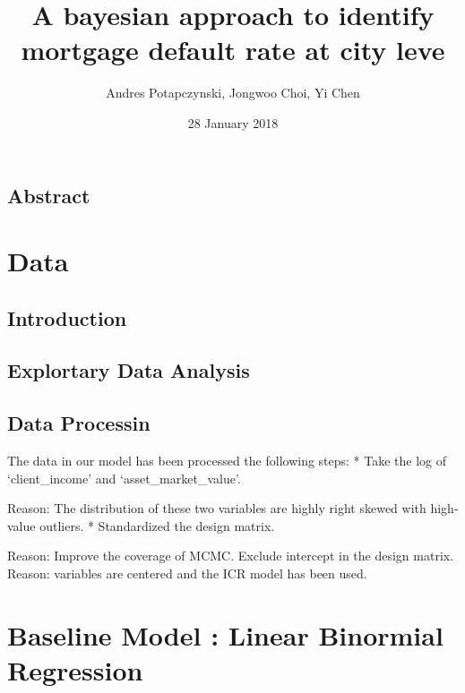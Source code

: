 \documentclass[]{tufte-handout}
\title{A bayesian approach to identify mortgage default rate at city leve}
\author{Andres Potapczynski, Jongwoo Choi, Yi Chen}
\date{28 January 2018}
\begin{document}
\maketitle



{
\setcounter{tocdepth}{2}
\tableofcontents
}

\hypertarget{abstract}{%
\subsection*{Abstract}\label{abstract}}

\hypertarget{data}{%
\section{Data}\label{data}}

\hypertarget{introduction}{%
\subsection{Introduction}\label{introduction}}

\hypertarget{explortary-data-analysis}{%
\subsection{Explortary Data Analysis}\label{explortary-data-analysis}}

\hypertarget{data-processin}{%
\subsection{Data Processin}\label{data-processin}}

The data in our model has been processed the following steps: * Take the
log of `client\_income' and `asset\_market\_value'.

Reason: The distribution of these two variables are highly right skewed
with high-value outliers. * Standardized the design matrix.

Reason: Improve the coverage of MCMC. Exclude intercept in the design
matrix. Reason: variables are centered and the ICR model has been used.

\hypertarget{baseline-model-linear-binormial-regression}{%
\section{Baseline Model : Linear Binormial
Regression}\label{baseline-model-linear-binormial-regression}}
\end{document}
